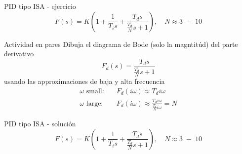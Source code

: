\documentclass[presentation,aspectratio=1610]{beamer}
\begin{document}
\begin{frame}[label={sec:org8a73c62}]{PID tipo ISA - ejercicio}
\[ F(s) = K\left( 1 + \frac{1}{T_i s} + \frac{T_d s}{\frac{T_d}{N} s + 1}\right), \quad N \approx 3\; - \; 10 \]

\alert{Actividad en pares} Dibuja el diagrama de Bode (solo la magntitúd)  del parte derivativo \[F_d(s) = \frac{T_d s}{\frac{T_d}{N} s + 1}\] usando las approximaciones de baja y alta frecuencia
\begin{align*}
 \text{$\omega$ small:} \quad & F_d(i\omega) \approx T_d i\omega \\
 \text{$\omega$ large:} \quad & F_d(i\omega) \approx \frac{T_d i \omega }{\frac{T_d}{N} i\omega} = N
\end{align*}
\end{frame}

\begin{frame}[label={sec:org2540245}]{PID tipo ISA - solución}
\[ F(s) = K\left( 1 + \frac{1}{T_i s} + \frac{T_d s}{\frac{T_d}{N} s + 1}\right), \quad N \approx 3\; - \; 10 \]

\begin{center}
  \def\Td{1}
  \def\NN{6}
\end{center}
\end{frame}
\end{document}
